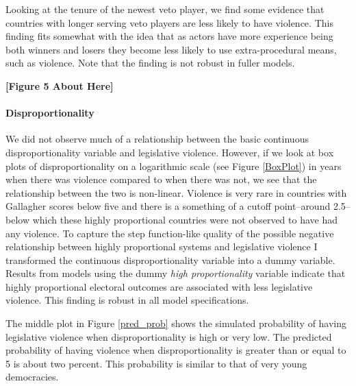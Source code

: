 \documentclass[a4paper]{article}\usepackage{graphicx, color}
\begin{document}
{{Looking at the tenure of the newest veto player, we find some evidence that countries with longer serving veto players are less likely to have violence. This finding fits somewhat with the idea that as actors have more experience being both winners and losers they become less likely to use extra-procedural means, such as violence. Note that the finding is not robust in fuller models.

\begin{center}

    {\bf{[Figure 5 About Here]}}

\end{center}

\paragraph{Disproportionality}
We did not observe much of a relationship between the basic continuous disproportionality variable and legislative violence. However, if we look at box plots of disproportionality on a logarithmic scale (see Figure \ref{BoxPlot}) in years when there was violence compared to when there was not, we see that the relationship between the two is non-linear. Violence is very rare in countries with Gallagher scores below five and there is a something of a cutoff point--around 2.5--below which these highly proportional countries were not observed to have had any violence. To capture the step function-like quality of the possible negative relationship between highly proportional systems and legislative violence I transformed the continuous disproportionality variable into a dummy variable. Results from models using the dummy {\emph{high proportionality}} variable indicate that highly proportional electoral outcomes are associated with less legislative violence. This finding is robust in all model specifications.

The middle plot in Figure \ref{pred_prob} shows the simulated probability of having legislative violence when disproportionality is high or very low. The predicted probability of having violence when disproportionality is greater than or equal to 5 is about two percent. This probability is similar to that of very young democracies.

}}
\end{document}
